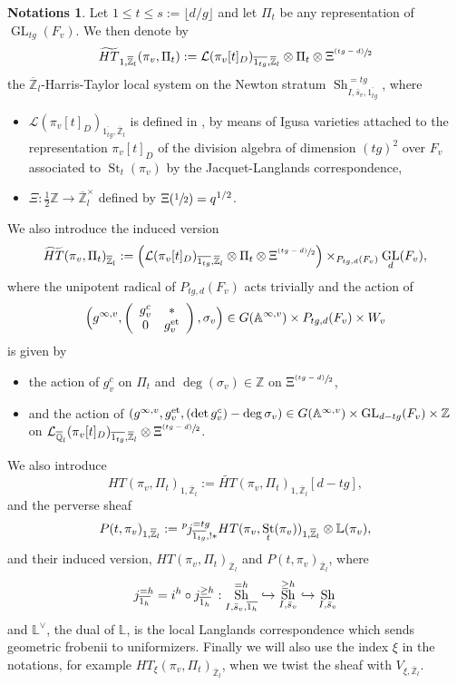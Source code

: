 \documentclass[JEP,XML,SOM,Unicode,published]{cedram}
\newcommand{\NoChangel}[1]{%
\expandafter\let\csname old\string#1\endcsname=#1
\let#1=\relax
\newcommand{#1}{\mathcode`l="716C\csname old\string#1\endcsname\mathcode`l="7160 }%
}
\def\hto{\mathrel{\lhook\joinrel\to}}
\newcommand{\psfrac}[2]{\sfrac{(#1)}{#2}}
\DeclareMathOperator{\GL}{GL}
\theoremstyle{plain}
\theoremstyle{definition}
\newtheorem{notas}[equation]{Notations}
\numberwithin{equation}{subsection}
\newcommand\Am{{\mathbb A}}
\newcommand\Qm{{\mathbb Q}}
\newcommand\Zm{{\mathbb Z}}
\newcommand\Lm{{\mathbb L}}
\newcommand\LC{{\mathcal L}}
\newcommand{\lexp}[2]{\kern \scriptspace \vphantom{#2}^{#1}\kern-\scriptspace#2}
\DeclareMathOperator{\sh}{Sh}
\DeclareMathOperator{\val}{val}\NoChangel{\val}
\DeclareMathOperator{\st}{St}
\let \oo=\infty
\begin{document}
\begin{notas}
Let $1 \leq t \leq s:=\lfloor d/g \rfloor$ and let $\Pi_t$ be any representation of
$\GL_{tg}(F_v)$. We then denote by
\[
\widetilde{HT}_{1,\overline \Zm_l}(\pi_v,\Pi_t):=\LC(\pi_v[t]_D)_{\overline{1_{tg}},\overline \Zm_l}
\otimes \Pi_t \otimes \Xi^{\psfrac{tg-d}{2}}
\]
the $\overline \Zm_l$-Harris-Taylor local system on the Newton stratum
$\sh^{=tg}_{I,\bar s_v,\overline{1_{tg}}}$, where
\begin{itemize}
\item $\LC(\pi_v[t]_D)_{\overline{1_{tg}},\overline \Zm_l}$ is defined in \cite[\S IV-1]{h-t}, by means of
Igusa varieties attached to the representation $\pi_v[t]_D$ of the division
algebra of dimension
$(tg)^2$ over $F_v$ associated to $\st_t(\pi_v)$ by the Jacquet-Langlands correspondence,

\item $\Xi:\frac{1}{2} \Zm \to \overline \Zm_l^\times$ defined by $\Xi(\sfrac{1}{2})=q^{1/2}$.
\end{itemize}
We also introduce the induced version
\[
\widetilde{HT}(\pi_v,\Pi_t)_{\overline \Zm_l}:=
\Bigl (\LC(\pi_v[t]_D)_{\overline{1_{tg}},\overline \Zm_l}
\otimes \Pi_t \otimes \Xi^{\psfrac{tg-d}{2}} \Bigr) \times_{P_{tg,d}(F_v)} \GL_d(F_v),
\]
where the unipotent radical of $P_{tg,d}(F_v)$ acts trivially and the action of
\[
\Bigl(g^{\oo,v},\left (\begin{array}{cc} g_v^c & * \\ 0 & g_v^\mathrm{et} \end{array} \right),\sigma_v\Bigr)
\in G(\Am^{\oo,v}) \times P_{tg,d}(F_v) \times W_v
\]
is given by
\begin{itemize}
\item the action of $g_v^c$ on $\Pi_t$ and
$\deg(\sigma_v) \in \Zm$ on $ \Xi^{\psfrac{tg-d}{2}}$,

\item and the action of $(g^{\oo,v},g_v^\mathrm{et},\val(\det g_v^c)-\deg \sigma_v)
\in G(\Am^{\oo,v}) \times \GL_{d-tg}(F_v) \times \Zm$ on $\LC_{\overline \Qm_l}
(\pi_v[t]_D)_{\overline{1_{tg}},\overline \Zm_l} \otimes \Xi^{\psfrac{tg-d}{2}}$.
\end{itemize}
We also introduce
\[
HT(\pi_v,\Pi_t)_{1,\overline \Zm_l}:=\widetilde{HT}(\pi_v,\Pi_t)_{1,\overline \Zm_l}
[d-tg],
\]
and the perverse sheaf
\[
P(t,\pi_v)_{1,\overline \Zm_l}:=\lexp p j^{=tg}_{\overline{1_{tg}},!*} HT(\pi_v,\st_t(\pi_v))_{1,\overline \Zm_l}
\otimes \Lm(\pi_v),
\]
and their induced version, $HT(\pi_v,\Pi_t)_{\overline \Zm_l}$ and $P(t,\pi_v)_{\overline \Zm_l}$, where
\[
j^{=h}_{\overline{1_h}}=i^h \circ j^{\geq h}_{\overline{1_h}}:\sh^{=h}_{I,\bar s_v,\overline{1_h}} \hto
\sh^{\geq h}_{I,\bar s_v} \hto \sh_{I,\bar s_v}
\]
and $\Lm^\vee$, the dual of $\Lm$, is the local Langlands correspondence
which sends geometric frobenii to uniformizers.
Finally we will also use the index $\xi$ in the notations, for example
$HT_\xi(\pi_v,\Pi_t)_{\overline \Zm_l}$,
when we twist the sheaf with $V_{\xi,\overline \Zm_l}$.
\end{notas}
\end{document}
